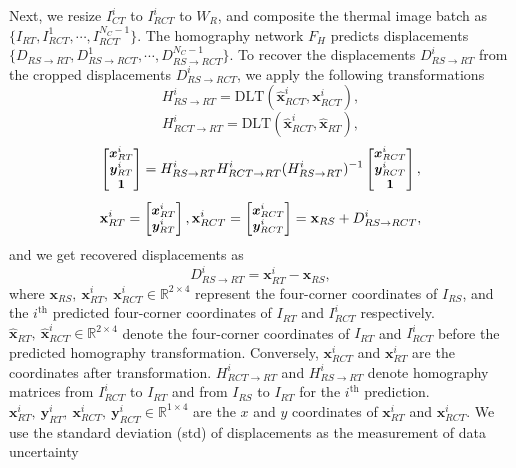 Next, we resize $I^i_{CT}$ to $I^i_{RCT}$ to $W_R$, and composite the thermal image batch as $\{I_{RT}, I^1_{RCT},\cdots,I^{N_C-1}_{RCT}\}$. The homography network $F_H$ predicts displacements $\{D_{RS\rightarrow RT}, D^1_{RS\rightarrow RCT},\cdots,D^{N_C-1}_{RS\rightarrow RCT}\}$. To recover the displacements $D^i_{RS\rightarrow RT}$ from the cropped displacements $D^i_{RS\rightarrow RCT}$, we apply the following transformations
\begin{equation}
    H^i_{RS\rightarrow RT} = \textrm{DLT}(\mathbf{\hat x}^i_{RCT}, \mathbf{x}^i_{RCT}),
\end{equation}
\begin{equation}
    H^i_{RCT\rightarrow RT} = \textrm{DLT}(\mathbf{\hat x}^i_{RCT}, \mathbf{\hat x}_{RT}),
\end{equation}
\begin{equation}\small
     \begin{bmatrix}
       \bm{x}^i_{RT}\\ \bm{y}^i_{RT} \\ \mathbf{1}
   \end{bmatrix} = H^i_{RS\rightarrow RT}H^i_{RCT\rightarrow RT}(H^i_{RS\rightarrow RT})^{-1}\begin{bmatrix}
       \bm{x}^i_{RCT}\\ \bm{y}^i_{RCT} \\ \mathbf{1}
   \end{bmatrix},
\end{equation}
\begin{equation}\small
   \mathbf{x}^i_{RT} = \begin{bmatrix}
       \bm{x}^i_{RT}\\ \bm{y}^i_{RT}
   \end{bmatrix},
    \mathbf{x}^i_{RCT} = \begin{bmatrix}
       \bm{x}^i_{RCT}\\ \bm{y}^i_{RCT}
   \end{bmatrix} = \mathbf{x}_{RS} + D^i_{RS\rightarrow RCT},
\end{equation}
and we get recovered displacements as
\begin{equation}
        D^i_{RS\rightarrow RT} = \mathbf{x}^i_{RT} - \mathbf{x}_{RS},
\end{equation}
where $\mathbf{x}_{RS},~\mathbf{x}^i_{RT},~\mathbf{x}^i_{RCT}\in \mathbb{R}^{2\times4}$ represent the four-corner coordinates of $I_{RS}$, and the $i^\text{th}$ predicted four-corner coordinates of $I_{RT}$ and $I^i_{RCT}$ respectively. $\mathbf{\hat x}_{RT},~\mathbf{\hat x}^i_{RCT}\in \mathbb{R}^{2\times4}$ denote the four-corner coordinates of $I_{RT}$ and $I^i_{RCT}$ before the predicted homography transformation. Conversely,  $\mathbf{x}^i_{RCT}$ and $\mathbf{x}^i_{RT}$ are the coordinates after transformation. $H^i_{RCT\rightarrow RT}$ and $H^i_{RS\rightarrow RT}$ denote homography matrices from $I^i_{RCT}$ to $I_{RT}$ and from $I_{RS}$ to $I_{RT}$ for the $i^\text{th}$ prediction. $\bm{x}^i_{RT},~\bm{y}^i_{RT},~\bm{x}^i_{RCT},~\bm{y}^i_{RCT} \in \mathbb{R}^{1\times 4}$ are the $x$ and $y$ coordinates of $\mathbf{x}^i_{RT}$ and $\mathbf{x}^i_{RCT}$. We use the standard deviation (std) of displacements as the measurement of data uncertainty

